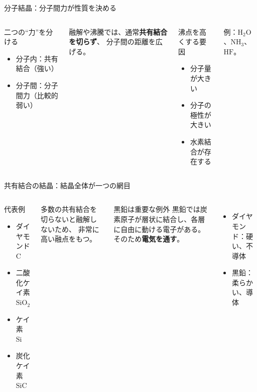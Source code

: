 \documentclass[notheorems,aspectratio=169]{beamer}
\newcommand{\key}[1]{\textbf{\color{ChinaRed}#1}}
\newcommand{\chem}[1]{\mathrm{#1}}
\begin{document}
\begin{frame}{分子結晶：分子間力が性質を決める}
  \begin{columns}[T,onlytextwidth]
    \begin{block}{二つの“力”を分ける}
      \begin{itemize}
        \item 分子内：共有結合（強い）
        \item 分子間：分子間力（比較的弱い）
      \end{itemize}
    \end{block}
    融解や沸騰では、通常\key{共有結合を切らず}、
    分子間の距離を広げる。
    \begin{exampleblock}{沸点を高くする要因}
      \begin{itemize}
        \item 分子量が大きい
        \item 分子の極性が大きい
        \item 水素結合が存在する
      \end{itemize}
    \end{exampleblock}
    例：$\chem{H_2O}$、$\chem{NH_3}$、$\chem{HF}$。
  \end{columns}

  \vfill
  \centering
\end{frame}

\begin{frame}{共有結合の結晶：結晶全体が一つの網目}
  \begin{columns}[T,onlytextwidth]
    \begin{block}{代表例}
      \begin{itemize}
        \item ダイヤモンド $\chem C$
        \item 二酸化ケイ素 $\chem{SiO_2}$
        \item ケイ素 $\chem{Si}$
        \item 炭化ケイ素 $\chem{SiC}$
      \end{itemize}
    \end{block}
    多数の共有結合を切らないと融解しないため、
    非常に高い融点をもつ。
    \begin{alertblock}{黒鉛は重要な例外}
      黒鉛では炭素原子が層状に結合し、各層に自由に動ける電子がある。
      そのため\key{電気を通す}。
    \end{alertblock}
    \begin{itemize}
      \item ダイヤモンド：硬い、不導体
      \item 黒鉛：柔らかい、導体
    \end{itemize}
  \end{columns}
\end{frame}
\end{document}
